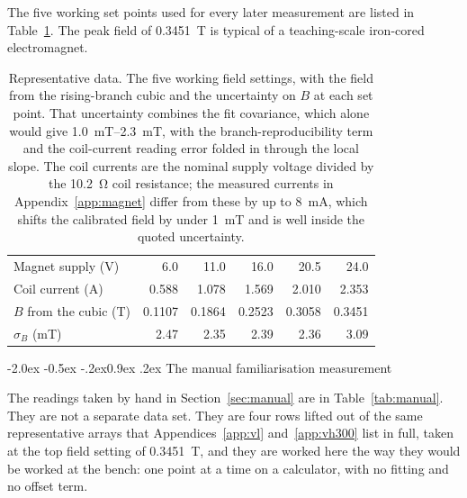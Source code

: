 \documentclass[11pt,a4paper]{article}
\makeatletter
\renewcommand\subsection{\@startsection{subsection}{2}{\z@}%
  {-2.0ex \@plus -0.5ex \@minus -.2ex}{0.9ex \@plus .2ex}%
  {\normalfont\normalsize\bfseries}}
\makeatother
\begin{document}
The five working set points used for every later measurement are listed in
Table~\ref{tab:setpoints}. The peak field of \qty{0.3451}{\tesla} is typical of a
teaching-scale iron-cored electromagnet.

\begin{table}[htbp]
\centering
\caption{Representative data. The five working field settings, with the field from the
rising-branch cubic and the uncertainty on $B$ at each set point. That uncertainty combines
the fit covariance, which alone would give \qtyrange{1.0}{2.3}{\milli\tesla}, with the
branch-reproducibility term and the coil-current reading error folded in through the local
slope. The coil currents are the nominal supply voltage divided by the \qty{10.2}{\ohm} coil
resistance; the measured currents in Appendix~\ref{app:magnet} differ from these by up to
\qty{8}{\milli\ampere}, which shifts the calibrated field by under \qty{1}{\milli\tesla} and
is well inside the quoted uncertainty.}
\label{tab:setpoints}
\begin{tabular}{lrrrrr}
\toprule
Magnet supply (\unit{\volt}) & 6.0 & 11.0 & 16.0 & 20.5 & 24.0 \\
Coil current (\unit{\ampere}) & 0.588 & 1.078 & 1.569 & 2.010 & 2.353 \\
$B$ from the cubic (\unit{\tesla}) & 0.1107 & 0.1864 & 0.2523 & 0.3058 & 0.3451 \\
$\sigma_B$ (\unit{\milli\tesla}) & 2.47 & 2.35 & 2.39 & 2.36 & 3.09 \\
\bottomrule
\end{tabular}
\end{table}

\subsection{The manual familiarisation measurement}
\label{sec:manualresult}

The readings taken by hand in Section~\ref{sec:manual} are in Table~\ref{tab:manual}. They are
not a separate data set. They are four rows lifted out of the same representative arrays that
Appendices~\ref{app:vl} and~\ref{app:vh300} list in full, taken at the top field setting of
\qty{0.3451}{\tesla}, and they are worked here the way they would be worked at the bench: one
point at a time on a calculator, with no fitting and no offset term.
\end{document}
